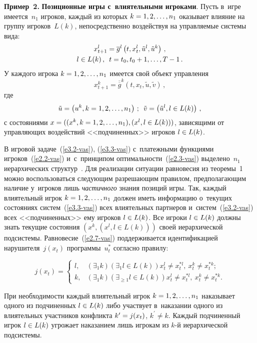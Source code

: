 \begin{multicols}{2}
    \textbf{Пример~2.} \textbf{Позиционные игры с~влиятельными игроками}.
    Пусть в~игре имеется~$n_1$ игроков, каждый из которых $k\hm=1,2,\ldots,n_1$ 
оказывает влияние на группу игроков~$L(k)$, непосредственно воздействуя на 
управляемые системы вида:
    \begin{multline}
    x^l_{t+1}=\overline{g}^l\left( t,x_t^l, \tilde{u}^l, \tilde{u}^k\right)\,,\\
    l\in L(k)\,,\enskip t=t_0, t_0+1,\ldots, T-1\,.
    \label{e3.2-vas}
    \end{multline}
У каждого игрока $k\hm=1,2,\ldots, n_1$ имеется свой объект управления
\begin{equation}
x^k_{t+1}=\overline{\overline{g}}^k\left( t,x_t,\tilde{u},\tilde{v}\right)\,,
\label{e3.3-vas}
\end{equation}
где
$$
\tilde{u}=\left( u^k, k=1,2,\ldots, n_1\right)\,;\enskip
\tilde{v}=\left( \tilde{u}^l, l\in L(k)\right)\,,
$$
с состояниями $x\hm= ((x^k, k=1,2,\ldots, n_1), (x^l, l\hm\in L(k)))$, зависящими от 
управляющих воздействий <<подчиненных>> игроков $l\hm\in L(k)$. 
    
    В игровой задаче~(\ref{e3.2-vas}), (\ref{e3.3-vas}) с~платежными функциями 
игроков~(\ref{e2.2-vas}) и~с~принципом оп\-ти\-маль\-ности~(\ref{e2.3-vas}) 
выделено~$n_1$ иерархических структур~\cite{2-vas}. Для реализации ситуации 
равновесия из теоремы~1 можно воспользоваться следующим разрешающим 
правилом, предполагающим наличие у~игроков лишь \textit{частичного} знания 
позиций игры. Так, каждый влиятельный игрок $k\hm= 1,2,\ldots, n_1$ должен иметь 
информацию о~текущих состояниях сис\-тем~(\ref{e3.3-vas}) всех влиятельных 
партнеров и~сис\-тем~(\ref{e3.2-vas}) всех <<подчиненных>> ему игроков $l\hm\in 
L(k)$. Все игроки $l\hm\in L(k)$ должны знать текущие состояния $(x^k, (x^l, l\in 
L(k)))$ своей иерархической под\-сис\-те\-мы. Равновесие~(\ref{e2.7-vas}) 
поддерживается идентификацией нарушителя~$j(x_t)$ программы~$u_t^*$ согласно 
правилу:

\noindent
    $$
    j(x_t) =\begin{cases}
    l, &\! \left(\exists_1 k\right) \left( \exists_1 l\in L(k)\right) x_t^l\not= x_t^{*l},\ 
x_t^k\not= x_t^{*k};\\
    k, &\! \left(\exists_1 k\right) \left( \exists_{\geq1} l\in L(k)\right) x_t^l\not= x_t^{*l},\ 
x_t^k\not= x_t^{*k}.
    \end{cases}
    $$
    
    При необходимости каждый влиятельный игрок $k\hm= 1,2,\ldots , n_1$ 
наказывает одного из подчиненных $l\hm\in L(k)$ либо участвует в~наказании 
одного из влиятельных участников конфликта $k^\prime\hm= j(x_t)$, $k^\prime\not= 
k$. Каждый подчиненный игрок $l\hm\in L(k)$ угрожает наказанием лишь игрокам 
из $k$-й иерархической подсистемы.
    

\end{multicols}
